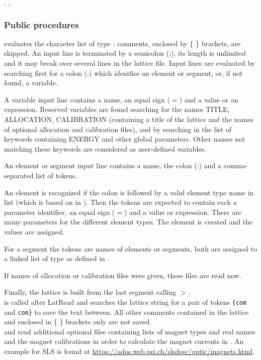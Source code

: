 \documentclass[12pt]{article}
\newcommand\code[1]{{\tt #1}}
\newcommand\guico[1]{{\color{blue}\code{#1}}}
\newcommand{\unico}[1]{{\color{burntorange}\code{#1}}}
\newcommand{\prcod}[2]{\opauni{#1}$>$\unico{#2}}
\newcommand{\opauni}[1]{\colorbox{orange!30}{{\color{black}\code{#1}}}}
\newcommand{\ouni}[1]{\hyperref[#1]{\opauni{#1}}}
\newcommand{\uses}[1]{\flushleft {\bf Uses:} #1}
\newcommand{\ppro}[1]{\subsubsection*{Public procedures} #1}
\begin{document}
\uses{\ouni{globlib}, \ouni{mathlib}, \ouni{../com/asaux}}

\ppro{
\unico{Latread} evaluates the character list of type \unico{TextBuffer}: comments, enclosed by \{ \} brackets, are skipped. An input line is terminated by a semicolon (;), its length is unlimited and it may break over several lines in the lattice file.  Input lines are evaluated by searching first for a colon (:) which identfies an element or segment, or, if not found, a variable.

A variable input line contains a name, an equal sign ($=$) and a value or an expression.
Reserved variables are found searching for the names TITLE, ALLOCATION, CALIBRATION (containing a title of the lattice and the names of optional allocation and calibration files), and by searching in the list of keywords \unico{globkeyw} containing ENERGY and other global parameters. Other names not matching these keywords are considered as user-defined variables.

An element or segment input line contains a name, the colon (:) and a comma-separated list of tokens.

An element is recognized if the colon is followed by a valid element type name in list \unico{elemkeyw} (which is based on \unico{ElemName} in \ouni{globlib}). Then the tokens are expected to contain each a parameter identifier, an equal sign ($=$) and a value or expression. There are many parameters for the different element types. The element is created and the values are assigned.

For a segment the tokens are names of elements or segments, both are  assigned to a linked list of type \unico{AbstractEleType} as defined in \ouni{globlib}.

If names of allocation or calibration files were given, these files are read now.

Finally, the lattice is built from the last segment calling \prcod{globlib}{MakeLattice}.\\


\unico{LatReadCom} is called after LatRead and searches the lattice string for a pair of tokens \code{\{com} and \code{com\}} to save the text between. All other comments contained in the lattice and enclosed in \{ \} brackets only are not saved.\\

\unico{ReadAllocation} and \unico{ReadCalibration} read additional optional files containing lists of magnet types and real names and the magnet calibrations in order to calculate the magnet currents in \guico{opacurrents}. 
An example for SLS is found at \url{https://ados.web.psi.ch/slsdesc/optic/magnets.html}. 

}
\end{document}

